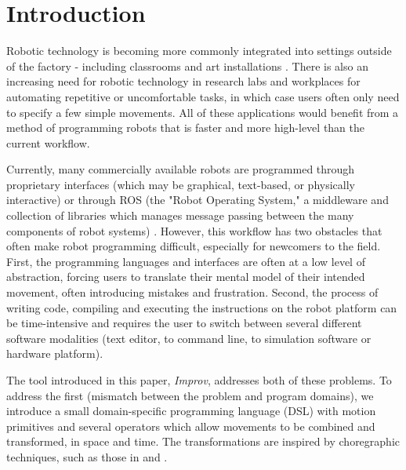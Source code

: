 \documentclass[sigconf]{acmart}
\begin{document}
%
%



\maketitle


\section{Introduction}\label{introduction}

Robotic technology is becoming more commonly integrated into settings outside of
the factory - including classrooms \cite{mataric2004robotics} and art installations
\cite{kukaDance2017}. There
is also an increasing need for robotic technology in research labs and
workplaces for automating repetitive or uncomfortable tasks, in which case
users often only need to specify a few simple movements. All of
these applications would benefit from a method of programming robots that is
faster and more high-level than the current workflow.


Currently, many commercially available robots are programmed through proprietary
interfaces (which may be graphical, text-based, or physically interactive) or through ROS (the "Robot Operating System,"
a middleware and collection of libraries which manages message passing between
the many components of robot systems) \cite{rossano2013easy}
\cite{quigley2009ros}. However, this
workflow has two obstacles that often make robot programming difficult,
especially for newcomers to the field. First, the programming languages and
interfaces are
often at a low level of abstraction, forcing users to translate their
mental model of their intended movement, often introducing
mistakes and frustration. Second, the process of writing code, compiling and
executing the instructions on the robot platform can be time-intensive and
requires the user to switch between several different software modalities (text
editor, to command line, to simulation software or hardware platform).

The tool introduced in this paper, \emph{Improv}, addresses both of these
problems. To address the first (mismatch between the problem and
program domains), we introduce a small domain-specific programming language
(DSL) with motion primitives and several operators which allow
movements to be combined and transformed, in space and time. The transformations
are inspired by choregraphic techniques, such as those in
\cite{laviers2017choreographic} \cite{cuykendall2014designing} \cite{alaoui2014choreography} and
\cite{humphrey1959art}.
\end{document}

